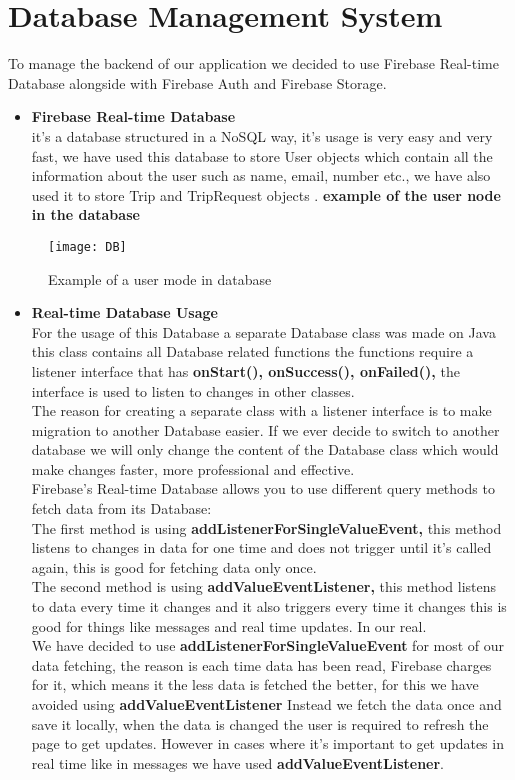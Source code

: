 \section{Database Management System}
To manage the backend of our application we decided to use Firebase Real-time Database alongside with Firebase Auth and Firebase Storage. 
\begin{itemize}
\item \textbf{Firebase Real-time Database }\\
it’s a database structured in a NoSQL way, it’s usage is very easy and very fast, we have used this database to store User objects which contain all the information about the user such as name, email, number etc., we have also used it to store Trip and TripRequest objects .
\textbf{example of the user node in the database}
\end{itemize}
\begin{figure}[ht]
\center
\texttt{[image: DB]} 
\caption{Example of a user mode in database}
\label{fig:Example of a user mode in database}
\end{figure}

\begin{itemize}
\item \textbf{Real-time Database Usage }\\
For the usage of this Database a separate Database class was made on Java this 
class contains all Database related functions the functions require a listener interface that 
has \textbf{onStart(), onSuccess(), onFailed(),} the interface is used to listen to changes in other 
classes.
\\ The reason for creating a separate class with a listener interface is to make 
migration to another Database easier. If we ever decide to switch to another database we 
will only change the content of the Database class which would make changes faster, more 
professional and effective. 
\\ Firebase’s Real-time Database allows you to use different query methods 
to fetch data from its Database: 
\\ The first method is using \textbf{addListenerForSingleValueEvent,} this method listens to changes 
in data for one time and does not trigger until it’s called again, this is good for fetching data 
only once. 
\\ The second method is using \textbf{addValueEventListener,} this method listens 
to data every time it changes and it also triggers every time it changes this is 
good for things like messages and real time updates. 
In our real. 
\\ We have decided to use \textbf{addListenerForSingleValueEvent} for most of our data 
fetching, the reason is each time data has been read, Firebase charges for it, which means 
it the less data is fetched the better, for this we have avoided using\textbf{ addValueEventListener} 
Instead we fetch the data once and save it locally, when the data is changed the user is 
required to refresh the page to get updates. However in cases where it’s important to get 
updates in real time like in messages we have used \textbf{addValueEventListener}. 
\end{itemize}


